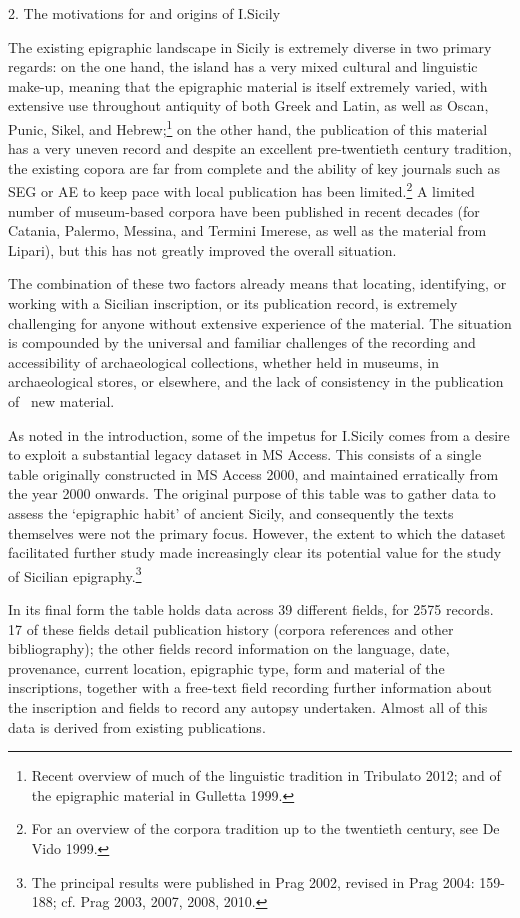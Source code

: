 \documentclass[amsthm,ebook]{saparticle}
\begin{document}
2. The motivations for and origins of I.Sicily

The existing epigraphic landscape in Sicily is extremely diverse in two primary regards: on the one hand, the island has
a very mixed cultural and linguistic make-up, meaning that the epigraphic material is itself extremely varied, with
extensive use throughout antiquity of both Greek and Latin, as well as Oscan, Punic, Sikel, and Hebrew;\footnote{
Recent overview of much of the linguistic tradition in Tribulato 2012; and of the epigraphic material in Gulletta
1999.} on the other hand, the publication of this material has a very uneven record and despite an excellent
pre-twentieth century tradition, the existing copora are far from complete and the ability of key journals such as SEG
or AE to keep pace with local publication has been limited.\footnote{ For an overview of the corpora tradition up to
the twentieth century, see De Vido 1999.} A limited number of museum-based corpora have been published in recent
decades (for Catania, Palermo, Messina, and Termini Imerese, as well as the material from Lipari), but this has not
greatly improved the overall situation.

The combination of these two factors already means that locating, identifying, or working with a Sicilian inscription,
or its publication record, is extremely challenging for anyone without extensive experience of the material. The
situation is compounded by the universal and familiar challenges of the recording and accessibility of archaeological
collections, whether held in museums, in archaeological stores, or elsewhere, and the lack of consistency in the
publication of \ new material.

As noted in the introduction, some of the impetus for I.Sicily comes from a desire to exploit a substantial legacy
dataset in MS Access. This consists of a single table originally constructed in MS Access 2000, and maintained
erratically from the year 2000 onwards. The original purpose of this table was to gather data to assess the ‘epigraphic
habit’ of ancient Sicily, and consequently the texts themselves were not the primary focus. However, the extent to
which the dataset facilitated further study made increasingly clear its potential value for the study of Sicilian
epigraphy.\footnote{ The principal results were published in Prag 2002, revised in Prag 2004: 159-188; cf. Prag 2003,
2007, 2008, 2010.}

In its final form the table holds data across 39 different fields, for 2575 records. 17 of these fields detail
publication history (corpora references and other bibliography); the other fields record information on the language,
date, provenance, current location, epigraphic type, form and material of the inscriptions, together with a free-text
field recording further information about the inscription and fields to record any autopsy undertaken. Almost all of
this data is derived from existing publications.
\end{document}
